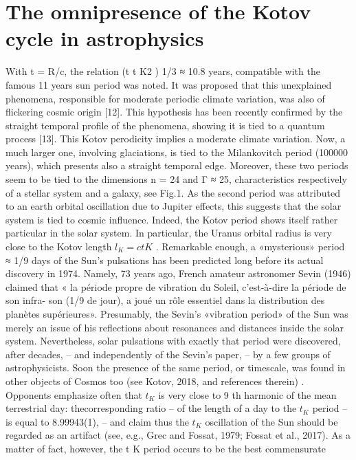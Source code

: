 \section {The omnipresence of the Kotov cycle in astrophysics}

With t = R/c, the relation (t t K2 ) 1/3 ≈ 10.8 years, compatible with the famous 11 years sun period
was noted. It was proposed that this unexplained phenomena, responsible for moderate periodic
climate variation, was also of flickering cosmic origin [12]. This hypothesis has been recently
confirmed by the straight temporal profile of the phenomena, showing it is tied to a quantum
process [13].
This Kotov perodicity implies a moderate climate variation. Now, a much larger one, involving
glaciations, is tied to the Milankovitch period (100000 years), which presents also a straight
temporal edge. Moreover, these two periods seem to be tied to the dimensions n = 24 and Γ ≈ 25,
characteristics respectively of a stellar system and a galaxy, see Fig.1. As the second period was
attributed to an earth orbital oscillation due to Jupiter effects, this suggests that the solar system is
tied to cosmic influence. Indeed, the Kotov period shows itself rather particular in the solar system.
In particular, the Uranus orbital radius is very close to the Kotov length $l_{K} = ct K$ .
Remarkable enough, a «mysterious» period ≈ 1/9 days of the Sun's pulsations has been predicted
long before its actual discovery in 1974. Namely, 73 years ago, French amateur astronomer Sevin
(1946) claimed that « la période propre de vibration du Soleil, c'est-à-dire la période de son infra-
son (1/9 de jour), a joué un rôle essentiel dans la distribution des planètes supérieures». Presumably,
the Sevin's «vibration period» of the Sun was merely an issue of his reflections about resonances
and distances inside the solar system. Nevertheless, solar pulsations with exactly that period were
discovered, after decades, – and independently of the Sevin's paper, – by a few groups of
astrophysicists. Soon the presence of the same period, or timescale, was found in other objects of
Cosmos too (see Kotov, 2018, and references therein) .
Opponents emphasize often that $t_{K}$ is very close to 9 th harmonic of the mean terrestrial day: thecorresponding ratio – of the length of a day to the $t_{K}$ period – is equal to 8.99943(1), – and claim
thus the $t_{K}$ oscillation of the Sun should be regarded as an artifact (see, e.g., Grec and Fossat, 1979;
Fossat et al., 2017). As a matter of fact, however, the t K period occurs to be the best commensurate
